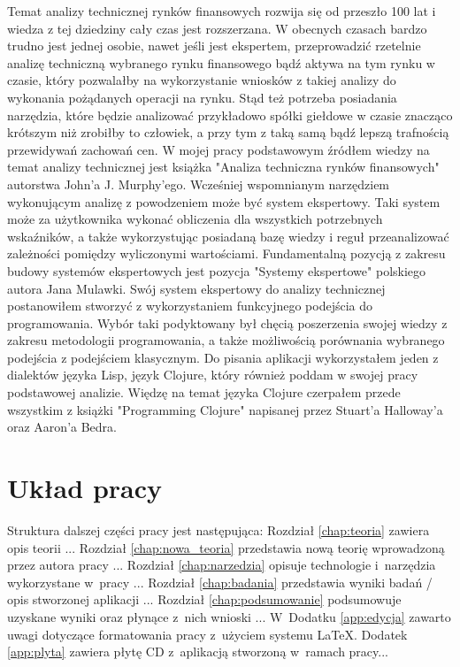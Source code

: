 Temat analizy technicznej rynków finansowych rozwija się od przeszło 100 lat i wiedza z tej dziedziny cały czas jest rozszerzana. W obecnych czasach bardzo trudno jest jednej osobie, nawet jeśli jest ekspertem, przeprowadzić rzetelnie analizę techniczną wybranego rynku finansowego bądź aktywa na tym rynku w czasie, który pozwalałby na wykorzystanie wniosków z takiej analizy do wykonania pożądanych operacji na rynku. Stąd też potrzeba posiadania narzędzia, które będzie analizować przykładowo spółki giełdowe w czasie znacząco krótszym niż zrobiłby to człowiek, a przy tym z taką samą bądź lepszą trafnością przewidywań zachowań cen. W mojej pracy podstawowym źródłem wiedzy na temat analizy technicznej jest książka "Analiza techniczna rynków finansowych" \cite{analiza} autorstwa John'a J. Murphy'ego. Wcześniej wspomnianym narzędziem wykonującym analizę z powodzeniem może być system ekspertowy. Taki system może za użytkownika wykonać obliczenia dla wszystkich potrzebnych wskaźników, a także wykorzystując posiadaną bazę wiedzy i reguł przeanalizować zależności pomiędzy wyliczonymi wartościami. Fundamentalną pozycją z zakresu budowy systemów ekspertowych jest pozycja "Systemy ekspertowe" \cite{mulawka} polskiego autora Jana Mulawki. Swój system ekspertowy do analizy technicznej postanowiłem stworzyć z wykorzystaniem funkcyjnego podejścia do programowania. Wybór taki podyktowany był chęcią poszerzenia swojej wiedzy z zakresu metodologii programowania, a także możliwością porównania wybranego podejścia z podejściem klasycznym. Do pisania aplikacji wykorzystałem jeden z dialektów języka Lisp, język Clojure, który również poddam w swojej pracy podstawowej analizie. Więdzę na temat języka Clojure czerpałem przede wszystkim z książki "Programming Clojure" \cite{clojure} napisanej przez Stuart'a Halloway'a oraz Aaron'a Bedra.

\section{Układ pracy}

Struktura dalszej części pracy jest następująca: Rozdział \ref{chap:teoria} zawiera opis teorii ... Rozdział \ref{chap:nowa_teoria} przedstawia nową teorię wprowadzoną przez autora pracy ... Rozdział \ref{chap:narzedzia} opisuje technologie i~narzędzia wykorzystane w~pracy ...  Rozdział \ref{chap:badania} przedstawia wyniki badań / opis stworzonej aplikacji ... Rozdział \ref{chap:podsumowanie} podsumowuje uzyskane wyniki oraz płynące z~nich wnioski ... W~Dodatku \ref{app:edycja} zawarto uwagi dotyczące formatowania pracy z~użyciem systemu \LaTeX. Dodatek \ref{app:plyta} zawiera płytę CD z~aplikacją stworzoną w~ramach pracy...